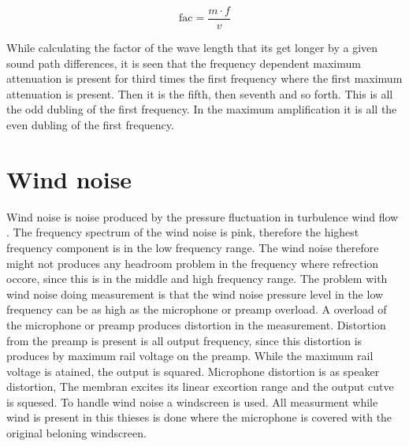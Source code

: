 \begin{equation}\label{pre:fac_wav}
\text{fac} = \frac{m \cdot f}{v}
\end{equation}  

\startexplain
{}
\stopexplain


While calculating the factor of the wave length that its get longer by a given sound path differences, it is seen that the frequency dependent maximum attenuation is present for third times the first frequency where the first maximum attenuation is present. Then it is the fifth, then seventh and so forth. This is all the odd dubling of the first frequency. In the maximum amplification it is all the  even dubling of the first frequency.


\section{Wind noise}\label{pre:wind_noise}
Wind noise is noise produced by the pressure fluctuation in turbulence wind flow \citep{doi:10.1121/1.4780400}. The frequency spectrum of the wind noise is pink, therefore the highest frequency component is in the low frequency range. The wind noise therefore might not produces any headroom problem in the frequency where refrection occore, since this is in the middle and high frequency range. The problem with wind noise doing measurement is that the wind noise pressure level in the low frequency can be as high as the microphone or preamp overload. A overload of the microphone or preamp produces distortion in the measurement. Distortion from the preamp is present is all output frequency, since this distortion is produces by maximum rail voltage on the preamp. While the maximum rail voltage is atained, the output is squared. Microphone distortion is as speaker distortion, The membran excites its linear excortion range and the output cutve is squesed. To handle wind noise a windscreen is used. All measurment while wind is present in this thieses is done where the microphone is covered with the original beloning windscreen.  



 